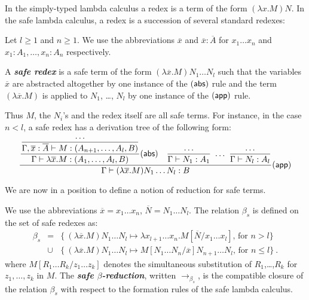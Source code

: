 \documentclass{llncs}
\newcommand\defname[1]{{\bf\em #1}\index{#1}}
\newcommand\betasred{\rightarrow_{\beta_s}}
\newcommand\subst[2]{\left[ #1/#2 \right]}
\newcommand\rulef[2]{\frac{\dps #1}{\dps #2}}
\begin{document}
In the simply-typed lambda calculus a redex is a term of the form
$(\lambda x . M) N$. In the safe lambda calculus, a redex is a
succession of several standard redexes:

\begin{definition}\rm
Let $l\geq 1$ and $n\geq 1$. We use the abbreviations $\overline{x}$ and $\overline{x}:\overline{A}$  for $x_1 \ldots x_n$ and $x_1:A_1, \ldots, x_n : A_n$ respectively.

A \defname{safe redex} is a safe term of the form $(\lambda
\overline{x} . M) N_1 \ldots N_l$ such that the variables
$\overline{x}$ are abstracted altogether by one instance of the
$(\sf{abs})$ rule and the term $(\lambda \overline{x} . M)$ is
applied to $N_1$, \ldots, $N_l$ by one instance of the $(\sf{app})$ rule. 
\end{definition}
Thus $M$, the $N_i$'s and the redex itself are all safe terms.
For instance, in the case $n<l$, a safe redex has a derivation tree of the following  form:
$$   \rulef{
            \rulef{\rulef{\ldots}{\Gamma, \overline{x}:\overline{A} \vdash M : (A_{n+1}, \ldots, A_l, B)}}{\Gamma \vdash \lambda \overline{x} . M : (A_1, \ldots, A_l, B)} ({\sf abs })
            \quad
            \rulef{\ldots}{\Gamma \vdash N_1 :A_1}  \ \ldots \  \rulef{\ldots}{\Gamma \vdash N_l :A_l}
    }
    {
       \Gamma \vdash (\lambda \overline{x} . M) N_1 \ldots N_l : B
    } ({\sf app})
$$


We are now in a position to define a notion of reduction for safe terms.

\begin{definition}\rm
\label{dfn:safereduction} We use the
abbreviations $\overline{x} = x_1 \ldots x_n$,
$\overline{N} = N_1 \ldots N_l$.
The relation $\beta_s$ is defined on the set of safe redexes as:
\begin{eqnarray*}
  \beta_s &=&
  \{  \ (\lambda \overline{x} . M) N_1 \ldots N_l \mapsto \lambda x_{l+1} \ldots x_n. M\subst{\overline{N}}{x_1 \ldots x_l} \mbox{, for $n> l$}
  \} \\
  &\cup&
  \{ \ (\lambda \overline{x}  . M) N_1 \ldots N_l \mapsto M\subst{N_1 \ldots N_n}{\overline{x}} N_{n+1} \ldots N_l
  \mbox{, for $n\leq l$} \} \ .
\end{eqnarray*}
where $M\subst{R_1 \ldots R_k}{z_1 \ldots z_k}$ denotes the simultaneous substitution of $R_1$,\ldots,$R_k$ for $z_1, \ldots, z_k$ in $M$.  The
\defname{safe $\beta$-reduction}, written $\betasred$, is the
compatible closure of the relation $\beta_s$ with respect to the
formation rules of the safe lambda calculus.
\end{definition}
\end{document}
